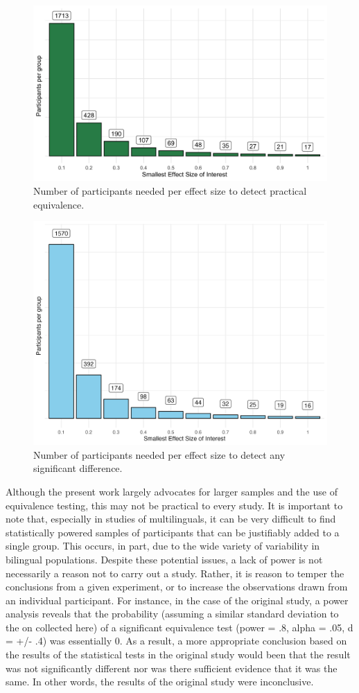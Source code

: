 \documentclass[
  man,floatsintext]{apa6}
\begin{document}
\begin{figure}
\includegraphics[width=425px]{figs/pc} \caption{Number of participants needed per effect size to detect practical equivalence.}\label{fig:pc}
\end{figure}

\begin{figure}
\includegraphics[width=425px]{figs/pc_t} \caption{Number of participants needed per effect size to detect any significant difference.}\label{fig:pct}
\end{figure}

Although the present work largely advocates for larger samples and the use of equivalence testing, this may not be practical to every study.
It is important to note that, especially in studies of multilinguals, it can be very difficult to find statistically powered samples of participants that can be justifiably added to a single group.
This occurs, in part, due to the wide variety of variability in bilingual populations.
Despite these potential issues, a lack of power is not necessarily a reason not to carry out a study.
Rather, it is reason to temper the conclusions from a given experiment, or to increase the observations drawn from an individual participant.
For instance, in the case of the original study, a power analysis reveals that the probability (assuming a similar standard deviation to the on collected here) of a significant equivalence test (power = .8, alpha = .05, d = +/- .4) was essentially 0.
As a result, a more appropriate conclusion based on the results of the statistical tests in the original study would been that the result was not significantly different nor was there sufficient evidence that it was the same.
In other words, the results of the original study were inconclusive.
\end{document}
